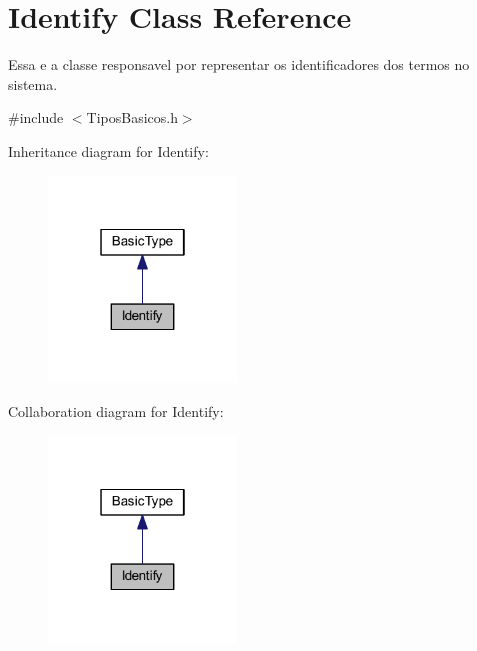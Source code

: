 \hypertarget{class_identify}{\section{Identify Class Reference}
\label{class_identify}
}


Essa e a classe responsavel por representar os identificadores dos termos no sistema.  




{\ttfamily \#include $<$Tipos\-Basicos.\-h$>$}



Inheritance diagram for Identify\-:\nopagebreak
\begin{figure}[H]
\begin{center}
\leavevmode
\includegraphics[width=142pt]{class_identify__inherit__graph}
\end{center}
\end{figure}


Collaboration diagram for Identify\-:\nopagebreak
\begin{figure}[H]
\begin{center}
\leavevmode
\includegraphics[width=142pt]{class_identify__coll__graph}
\end{center}
\end{figure}
